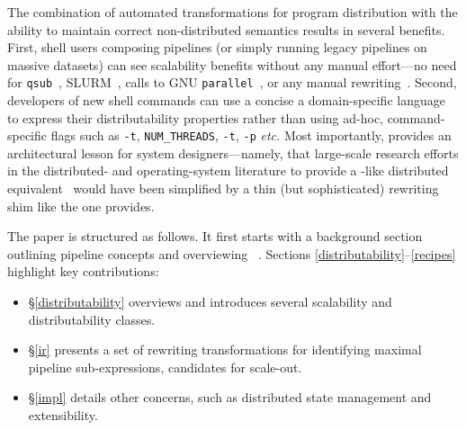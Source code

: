 \documentclass[sigplan,10pt,review,anonymous]{acmart}
\newcommand{\etc}{{\em etc.}\xspace}
\newcommand{\ttt}[1]{\texttt{\small #1}}
\begin{document}
The combination of automated transformations for program distribution with the ability to maintain correct non-distributed semantics results in several benefits.
First, shell users composing pipelines (or simply running legacy pipelines on massive datasets) can see scalability benefits without any manual effort---no need for \ttt{qsub}~\cite{gentzsch2001sun}, \textsc{SLURM}~\cite{yoo2003slurm}, calls to \textsc{GNU} \ttt{parallel}~\cite{Tange2011a}, or any manual rewriting~\cite{mapreduce:08, ciel:11, spark:12}.
Second, developers of new shell commands can use a concise a domain-specific language to express their distributability properties rather than using ad-hoc, command-specific flags such as {\tt -t},  {\tt NUM\_THREADS}, \ttt{-t}, \ttt{-p} \etc
Most importantly, \sys provides an architectural lesson for system designers---namely, that large-scale research efforts in the distributed- and operating-system literature to provide a \unix-like distributed equivalent~\cite{ousterhout1988sprite, mullender1990amoeba, pike1990plan9, barak1998mosix} would have been simplified by a thin (but sophisticated) rewriting shim like the one \sys provides.


The paper is structured as follows.
It first starts with a background section outlining pipeline concepts and overviewing \sys~.
Sections \ref{distributability}--\ref{recipes} highlight key contributions:
\begin{itemize}

  \item
  \S\ref{distributability} overviews \sys and introduces several scalability and distributability classes.

  \item
  \S\ref{ir} presents a set of rewriting transformations for identifying maximal pipeline sub-expressions, candidates for scale-out.

  \item
  \S\ref{impl} details other concerns, such as distributed state management and extensibility.
\end{itemize}
\end{document}
